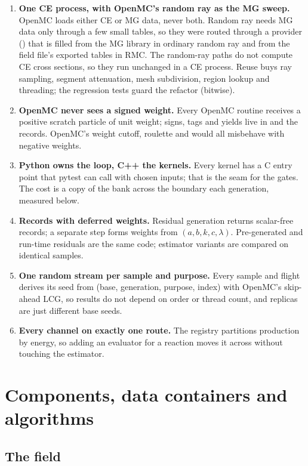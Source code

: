 \begin{enumerate}
\item \textbf{One CE process, with OpenMC's random ray as the MG sweep.} OpenMC loads either CE or MG
  data, never both. Random ray needs MG data only through a few small tables, so they were routed
  through a provider () that is filled from the MG library in ordinary random ray
  and from the field file's exported tables in RMC. The random-ray paths do not compute CE cross
  sections, so they run unchanged in a CE process. Reuse buys ray sampling, segment attenuation, mesh
  subdivision, region lookup and threading; the regression tests guard the refactor (bitwise).
\item \textbf{OpenMC never sees a signed weight.} Every OpenMC routine receives a positive scratch
  particle of unit weight; signs, tags and yields live in  and the records. OpenMC's
  weight cutoff, roulette and  would all misbehave with negative weights.
\item \textbf{Python owns the loop, C++ the kernels.} Every kernel has a C entry point that pytest
  can call with chosen inputs; that is the seam for the gates. The cost is a copy of the bank across
  the boundary each generation, measured below.
\item \textbf{Records with deferred weights.} Residual generation returns scalar-free records; a
  separate step forms weights from $(a,b,k,c,\lambda)$. Pre-generated and run-time residuals are the
  same code; estimator variants are compared on identical samples.
\item \textbf{One random stream per sample and purpose.} Every sample and flight derives its seed from
  (base, generation, purpose, index) with OpenMC's skip-ahead LCG, so results do not depend on order
  or thread count, and replicas are just different base seeds.
\item \textbf{Every channel on exactly one route.} The registry partitions production by energy, so
  adding an evaluator for a reaction moves it across without touching the estimator.
\end{enumerate}

\section{Components, data containers and algorithms}\label{sec:impl:components}

\subsection{The field}

